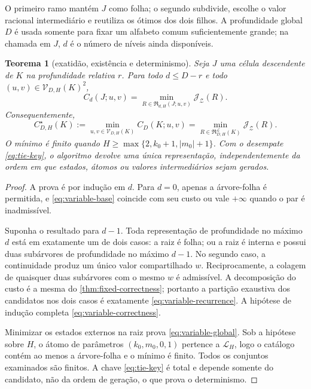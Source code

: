 \documentclass[11pt,a4paper]{article}
\newtheorem{theorem}{Teorema}[section]
\theoremstyle{definition}
\theoremstyle{remark}
\newcommand{\Library}{\mathcal{L}}
\newcommand{\Representations}{\mathfrak{R}}
\newcommand{\Values}{\mathcal{V}}
\newcommand{\cost}{\mathcal{J}}
\begin{document}
O primeiro ramo mantém $J$ como folha; o segundo subdivide, escolhe o valor
racional intermediário e reutiliza os ótimos dos dois filhos. A profundidade
global $D$ é usada somente para fixar um alfabeto comum suficientemente
grande; na chamada em $J$, $d$ é o número de níveis ainda disponíveis.

\begin{theorem}[exatidão, existência e determinismo]
\label{thm:variable-correctness}
Seja $J$ uma célula descendente de $K$ na profundidade relativa $r$. Para todo
$d\le D-r$ e todo $(u,v)\in\Values_{D,H}(K)^2$,
\begin{equation}
 C_d(J;u,v)
 =\min_{R\in\Representations_{d,H}(J;u,v)}
 \cost_{\mathcal Z}(R).
 \label{eq:variable-correctness}
\end{equation}
Consequentemente,
\begin{equation}
 C_{D,H}^{\star}(K)
 :=\min_{u,v\in\Values_{D,H}(K)}C_D(K;u,v)
 =\min_{R\in\Representations_{D,H}^{\Library}(K)}
 \cost_{\mathcal Z}(R).
 \label{eq:variable-global}
\end{equation}
O mínimo é finito quando
$H\ge\max\{2,k_0+1,|m_0|+1\}$. Com o desempate
\eqref{eq:tie-key}, o algoritmo devolve uma única representação, independentemente
da ordem em que estados, átomos ou valores intermediários sejam gerados.
\end{theorem}

\begin{proof}
A prova é por indução em $d$. Para $d=0$, apenas a árvore-folha é permitida,
e \eqref{eq:variable-base} coincide com seu custo ou vale $+\infty$ quando o
par é inadmissível.

Suponha o resultado para $d-1$. Toda representação de profundidade no máximo
$d$ está em exatamente um de dois casos: a raiz é folha; ou a raiz é interna
e possui duas subárvores de profundidade no máximo $d-1$. No segundo caso, a
continuidade produz um único valor compartilhado $w$. Reciprocamente, a
colagem de quaisquer duas subárvores com o mesmo $w$ é admissível. A
decomposição do custo é a mesma do \cref{thm:fixed-correctness}; portanto a
partição exaustiva dos candidatos nos dois casos é exatamente
\eqref{eq:variable-recurrence}. A hipótese de indução completa
\eqref{eq:variable-correctness}.

Minimizar os estados externos na raiz prova \eqref{eq:variable-global}. Sob a
hipótese sobre $H$, o átomo de parâmetros $(k_0,m_0,0,1)$ pertence a
$\Library_H$, logo o catálogo contém ao menos a árvore-folha e o mínimo é
finito. Todos os conjuntos examinados são finitos. A chave
\eqref{eq:tie-key} é total e depende somente do candidato, não da ordem de
geração, o que prova o determinismo.
\end{proof}
\end{document}
